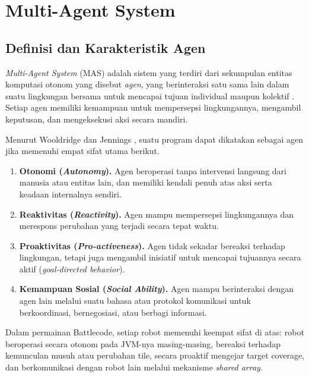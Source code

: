 \section{Multi-Agent System}
\subsection{Definisi dan Karakteristik Agen}

\textit{Multi-Agent System} (MAS) adalah sistem yang terdiri dari sekumpulan entitas komputasi otonom yang disebut \textit{agen}, yang berinteraksi satu sama lain dalam suatu lingkungan bersama untuk mencapai tujuan individual maupun kolektif \cite{wooldridge2009introduction}. Setiap agen memiliki kemampuan untuk mempersepsi lingkungannya, mengambil keputusan, dan mengeksekusi aksi secara mandiri.

Menurut Wooldridge dan Jennings \cite{wooldridge2009introduction}, suatu program dapat dikatakan sebagai agen jika memenuhi empat sifat utama berikut.

\begin{enumerate}
  \item \textbf{Otonomi (\textit{Autonomy}).} Agen beroperasi tanpa intervensi langsung dari manusia atau entitas lain, dan memiliki kendali penuh atas aksi serta keadaan internalnya sendiri.

  \item \textbf{Reaktivitas (\textit{Reactivity}).} Agen mampu mempersepsi lingkungannya dan merespons perubahan yang terjadi secara tepat waktu.

  \item \textbf{Proaktivitas (\textit{Pro-activeness}).} Agen tidak sekadar bereaksi terhadap lingkungan, tetapi juga mengambil inisiatif untuk mencapai tujuannya secara aktif (\textit{goal-directed behavior}).

  \item \textbf{Kemampuan Sosial (\textit{Social Ability}).} Agen mampu berinteraksi dengan agen lain melalui suatu bahasa atau protokol komunikasi untuk berkoordinasi, bernegosiasi, atau berbagi informasi.
\end{enumerate}

Dalam permainan Battlecode, setiap robot memenuhi keempat sifat di atas: robot beroperasi secara otonom pada JVM-nya masing-masing, bereaksi terhadap kemunculan musuh atau perubahan tile, secara proaktif mengejar target coverage, dan berkomunikasi dengan robot lain melalui mekanisme \textit{shared array}.

